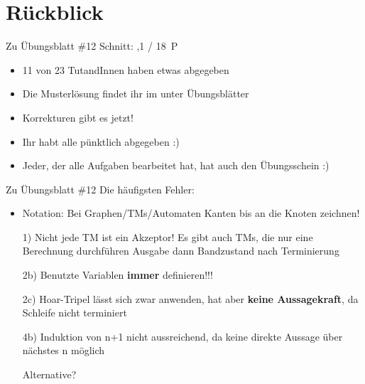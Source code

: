 
\newcommand{\handout}{}



\morescalingdelimiters



\section{Rückblick}

\begin{frame}{Zu Übungsblatt \#12}
	Schnitt: ,1 / 18~P

	\begin{itemize}[<+->]
		\item 11 von 23 TutandInnen haben etwas abgegeben
		\item Die Musterlösung findet ihr im \ILIAS unter Übungsblätter
		\item Korrekturen gibt es jetzt!
		\item Ihr habt alle pünktlich abgegeben :)
		\item Jeder, der alle Aufgaben bearbeitet hat, hat auch den Übungsschein :)
	\end{itemize}
\end{frame}

\begin{frame}{Zu Übungsblatt \#12}
	Die häufigsten Fehler:
	\begin{itemize}[<+->]
		\item Notation: Bei Graphen/TMs/Automaten Kanten bis an die Knoten zeichnen!
		\item[1)] Nicht jede TM ist ein Akzeptor! Es gibt auch TMs, die nur eine Berechnung durchführen \impl Ausgabe dann Bandzustand nach Terminierung
		\item[2b)] Benutzte Variablen \textbf{immer} definieren!!!
		\item[2c)] Hoar-Tripel lässt sich zwar anwenden, hat aber \textbf{keine Aussagekraft}, da Schleife nicht terminiert
		\item[4b)] Induktion von n+1 nicht aussreichend, da keine direkte Aussage über nächstes n möglich
		\item[] Alternative? 
	\end{itemize}
\end{frame}


